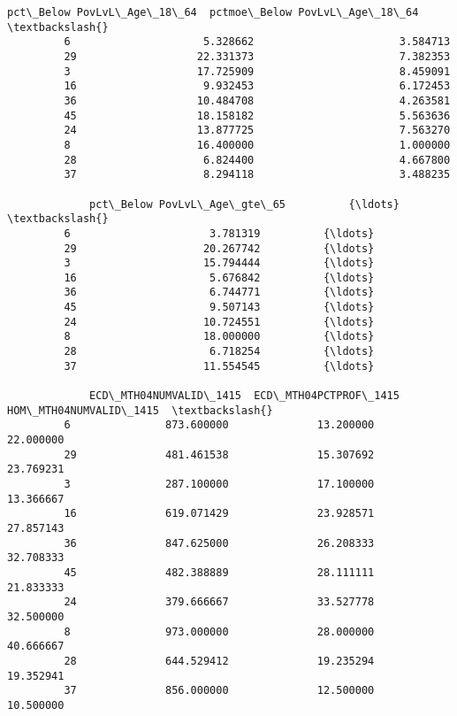 \documentclass[11pt]{article}
\begin{document}
\begin{Verbatim}[commandchars=\\\{\}]
             pct\_Below PovLvL\_Age\_18\_64  pctmoe\_Below PovLvL\_Age\_18\_64  \textbackslash{}
         6                     5.328662                       3.584713   
         29                   22.331373                       7.382353   
         3                    17.725909                       8.459091   
         16                    9.932453                       6.172453   
         36                   10.484708                       4.263581   
         45                   18.158182                       5.563636   
         24                   13.877725                       7.563270   
         8                    16.400000                       1.000000   
         28                    6.824400                       4.667800   
         37                    8.294118                       3.488235   
         
             pct\_Below PovLvL\_Age\_gte\_65          {\ldots}            \textbackslash{}
         6                      3.781319          {\ldots}             
         29                    20.267742          {\ldots}             
         3                     15.794444          {\ldots}             
         16                     5.676842          {\ldots}             
         36                     6.744771          {\ldots}             
         45                     9.507143          {\ldots}             
         24                    10.724551          {\ldots}             
         8                     18.000000          {\ldots}             
         28                     6.718254          {\ldots}             
         37                    11.554545          {\ldots}             
         
             ECD\_MTH04NUMVALID\_1415  ECD\_MTH04PCTPROF\_1415  HOM\_MTH04NUMVALID\_1415  \textbackslash{}
         6               873.600000              13.200000               22.000000   
         29              481.461538              15.307692               23.769231   
         3               287.100000              17.100000               13.366667   
         16              619.071429              23.928571               27.857143   
         36              847.625000              26.208333               32.708333   
         45              482.388889              28.111111               21.833333   
         24              379.666667              33.527778               32.500000   
         8               973.000000              28.000000               40.666667   
         28              644.529412              19.235294               19.352941   
         37              856.000000              12.500000               10.500000   
         

\end{Verbatim}
\end{document}
